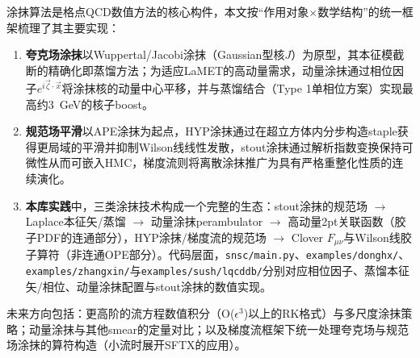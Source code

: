 \documentclass[12pt,a4paper]{ctexart}
\theoremstyle{definition}
\begin{document}
涂抹算法是格点QCD数值方法的核心构件，本文按``作用对象$\times$数学结构''的统一框架梳理了其主要实现：

\begin{enumerate}
    \item \textbf{夸克场涂抹}以Wuppertal/Jacobi涂抹（Gaussian型核$J$）为原型，其本征模截断的精确化即蒸馏方法；为适应LaMET的高动量需求，动量涂抹通过相位因子$e^{i\vec{\zeta}\cdot\vec{x}}$将涂抹核的动量中心平移，并与蒸馏结合（Type 1单相位方案）实现最高约3~GeV的核子boost\cite{Bali2016,Egerer2021a}。

    \item \textbf{规范场平滑}以APE涂抹为起点，HYP涂抹通过在超立方体内分步构造staple获得更局域的平滑并抑制Wilson线线性发散，stout涂抹通过解析指数变换保持可微性从而可嵌入HMC，梯度流则将离散涂抹推广为具有严格重整化性质的连续演化\cite{APE1987,HYP2001,Morningstar2004,LuscherWeisz2011}。

    \item \textbf{本库实践}中，三类涂抹技术构成一个完整的生态：stout涂抹的规范场 $\to$ Laplace本征矢/蒸馏 $\to$ 动量涂抹perambulator $\to$ 高动量2pt关联函数（胶子PDF的连通部分），HYP涂抹/梯度流的规范场 $\to$ Clover $F_{\mu\nu}$与Wilson线胶子算符（非连通OPE部分）\cite{Chen2025gluon,NoteGluonPDFs}。代码层面，\texttt{snsc/main.py}、\texttt{examples/donghx/}、\texttt{examples/zhangxin/}与\texttt{examples/sush/lqcddb/}分别对应相位因子、蒸馏本征矢/相位、动量涂抹配置与stout涂抹的数值实现。
\end{enumerate}

未来方向包括：更高阶的流方程数值积分（O($\epsilon^3$)以上的RK格式）与多尺度涂抹策略；动量涂抹与其他smear的定量对比；以及梯度流框架下统一处理夸克场与规范场涂抹的算符构造（小流时展开SFTX的应用）\cite{GradientFlowDoc}。

\end{document}
